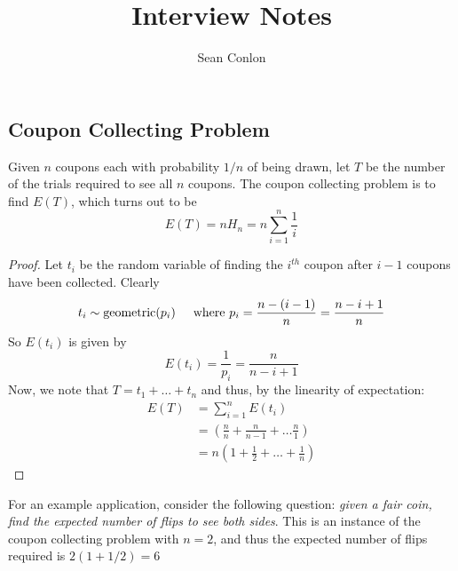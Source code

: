 \documentclass{article}
\title{Interview Notes}
\author{Sean Conlon}
\begin{document}
\maketitle

\newpage
\subsection*{Coupon Collecting Problem}
Given $n$ coupons each with probability $1/n$ of being drawn, let $T$ be the number of the trials required to see all $n$ coupons. The coupon collecting problem is to find $E(T)$, which turns out to be 
$$E(T) = n H_n = n \sum_{i=1}^{n}\frac{1}{i}$$
\begin{proof}
    Let $t_i$ be the random variable of finding the $i^{th}$ coupon after $i-1$ coupons have been collected. Clearly
    $$t_i \sim \text{geometric}(p_i) \hspace{5mm} \text{where } p_i = \frac{n-(i-1)}{n} = \frac{n-i+1}{n}$$
    So $E(t_i)$ is given by 
    $$E(t_i) = \frac{1}{p_i} = \frac{n}{n-i+1}$$
    Now, we note that $T = t_1 + \dots + t_n$ and thus, by the linearity of expectation: 
    \begin{align*}
        E(T) &= \sum_{i=1}^{n}E(t_i) \\
        &= \left(\frac{n}{n} + \frac{n}{n-1} + \dots \frac{n}{1} \right) \\
        &= n\left(1 + \frac{1}{2} + \dots + \frac{1}{n} \right)
    \end{align*}
\end{proof}
For an example application, consider the following question: \textit{given a fair coin, find the expected number of flips to see both sides}. This is an instance of the coupon collecting problem with $n=2$, and thus the expected number of flips required is $2(1+1/2) = 6$
\end{document}
